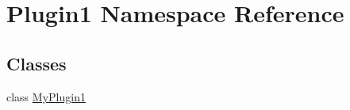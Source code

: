 \hypertarget{namespace_plugin1}{\section{\-Plugin1 \-Namespace \-Reference}
\label{namespace_plugin1}
}
\subsection*{\-Classes}
\begin{DoxyCompactItemize}
\item 
class \hyperlink{class_plugin1_1_1_my_plugin1}{\-My\-Plugin1}
\end{DoxyCompactItemize}

